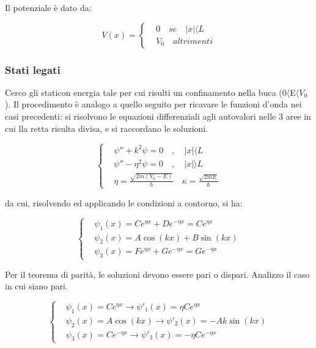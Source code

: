 \documentclass{article}
\begin{document}
Il potenziale è dato da:

\begin{equation}
  V(x)=
  \left\{
  \begin{aligned}
     & 0 \quad se \quad |x|\langle L \\
     & V_0 \quad altrimenti
  \end{aligned}
  \right.
\end{equation}

\subsubsection{Stati legati}
Cerco gli staticon energia tale per cui risulti un confinamento nella buca (0$\langle $E$\langle V_0$).
Il procedimento è analogo a quello seguito per ricavare le funzioni d'onda nei casi precedenti:
si risolvono le equazioni differenziali agli autovalori nelle 3 aree in cui lla retta risulta divisa, e si raccordano
le soluzioni.

\begin{equation}
  \left\{
  \begin{aligned}
     & \psi''+k^2\psi=0 \quad , \quad |x|\langle L                                 \\
     & \psi''-\eta^2\psi=0 \quad , \quad |x|\rangle L                              \\
     & \eta= \frac{\sqrt{2m(V_0-E)}}{\hbar} \quad \kappa= \frac{\sqrt{2mE}}{\hbar}
  \end{aligned}
  \right.
\end{equation}

da cui, risolvendo ed applicando le condizioni a contorno, si ha:

\begin{equation}
  \left\{
  \begin{aligned}
     & \psi_1(x)= Ce^{\eta x}+De^{-\eta x}= Ce^{\eta x}  \\
     & \psi_2(x)= A\cos(kx)+B\sin(kx)                    \\
     & \psi_3(x)= Fe^{\eta x}+Ge^{-\eta x}= Ge^{-\eta x}
  \end{aligned}
  \right.
\end{equation}

Per il teorema di parità, le soluzioni devono essere pari o dispari. Analizzo il caso in cui siano pari.

\begin{equation}
  \left\{
  \begin{aligned}
     & \psi_1(x)= Ce^{\eta x} \rightarrow \psi'_1(x)= \eta Ce^{\eta x}    \\
     & \psi_2(x)= A\cos(kx) \rightarrow \psi'_2(x)= -Ak\sin(kx)           \\
     & \psi_3(x)= Ce^{-\eta x} \rightarrow \psi'_3(x)= -\eta Ce^{-\eta x}
  \end{aligned}
  \right.
\end{equation}
\end{document}
